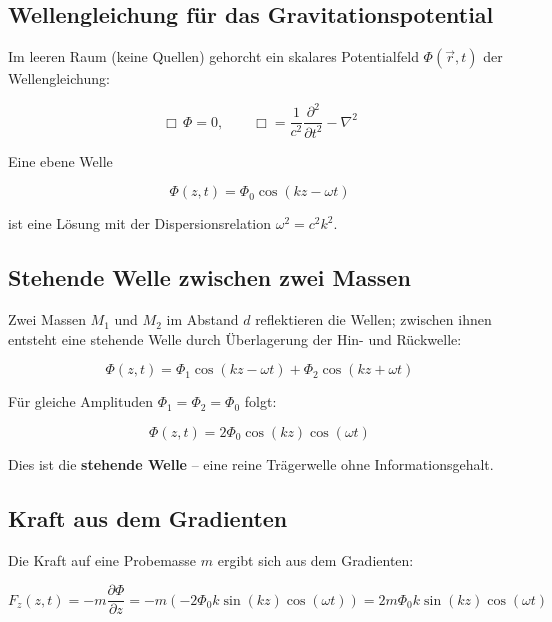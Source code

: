 \documentclass[11pt]{article}
\begin{document}
\subsection{Wellengleichung für das Gravitationspotential}

Im leeren Raum (keine Quellen) gehorcht ein skalares Potentialfeld \(\Phi(\vec{r},t)\) der Wellengleichung:

\begin{equation}
    \Box\, \Phi = 0, \qquad \Box = \frac{1}{c^2}\frac{\partial^2}{\partial t^2} - \nabla^2
\end{equation}

Eine ebene Welle

\begin{equation}
    \Phi(z,t) = \Phi_0 \cos(kz - \omega t)
\end{equation}

ist eine Lösung mit der Dispersionsrelation \(\omega^2 = c^2 k^2\).

\subsection{Stehende Welle zwischen zwei Massen}

Zwei Massen \(M_1\) und \(M_2\) im Abstand \(d\) reflektieren die Wellen; zwischen ihnen entsteht eine stehende Welle durch Überlagerung der Hin- und Rückwelle:

\begin{equation}
    \Phi(z,t) = \Phi_1 \cos(kz - \omega t) + \Phi_2 \cos(kz + \omega t)
\end{equation}

Für gleiche Amplituden \(\Phi_1 = \Phi_2 = \Phi_0\) folgt:

\begin{equation}
    \Phi(z,t) = 2\Phi_0 \cos(kz) \cos(\omega t)
\end{equation}

Dies ist die \textbf{stehende Welle} – eine reine Trägerwelle ohne Informationsgehalt.

\subsection{Kraft aus dem Gradienten}

Die Kraft auf eine Probemasse \(m\) ergibt sich aus dem Gradienten:

\begin{equation}
    F_z(z,t) = -m \frac{\partial \Phi}{\partial z} = -m \left( -2\Phi_0 k \sin(kz) \cos(\omega t) \right) = 2m\Phi_0 k \sin(kz) \cos(\omega t)
\end{equation}
\end{document}
